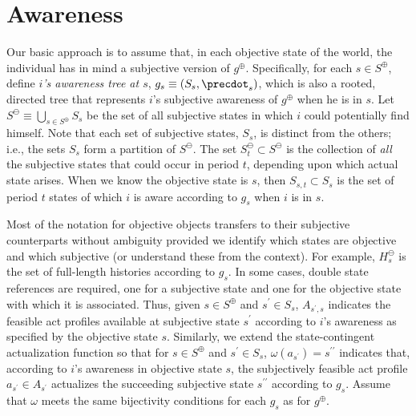 \documentclass[
11pt,
titlepage,
reqno,
]{article}%
\theoremstyle{definition}
\begin{document}
\section{Awareness}
Our basic approach is to assume that, in each objective state of the world, the individual has in mind a subjective version of $g^\oplus$. 
Specifically, for each $s\in S^\oplus$, define \textit{$i$'s awareness tree at $s$}, $g_s\equiv(S_s,\precdot_s)$, which is also a rooted, directed tree that represents $i$'s subjective awareness of $g^\oplus$ when he is in $s$.
Let $S^\ominus\equiv \bigcup_{s\in S^\oplus}S_s$ be the set of all subjective states in which $i$ could potentially find himself.
Note that each set of subjective states, $S_s$,  is distinct from the others; i.e., the sets $S_s$ form a partition of $S^\ominus$.
The set $S^\ominus_t\subset S^\ominus$ is the collection of \textit{all} the subjective states that could occur in period $t$, depending upon which actual state arises.
When we know the objective state is $s$, then $S_{s,t}\subset S_s$ is the set of period $t$ states of which $i$ is aware according to $g_s$ when $i$ is in $s$.

Most of the notation for objective objects transfers to their subjective counterparts without ambiguity provided we identify which states are objective and which subjective (or understand these from the context).
For example, $H^\ominus_s$ is the set of full-length histories according to $g_s$.
In some cases, double state references are required, one for a subjective state and one for the objective state with which it is associated.
Thus, given $s\in S^\oplus$ and $s^\prime\in S_s$, $A_{s^\prime,s}$ indicates the feasible act profiles available at subjective state $s^\prime$ according to $i$'s awareness as specified by the objective state $s$.
Similarly, we extend the state-contingent actualization function so that for $s\in S^\oplus$ and $s^\prime\in S_s$, $\omega(a_{s^\prime})=s^{\prime\prime}$ indicates that, according to $i$'s awareness  in objective state $s$, the subjectively feasible act profile $a_{s^\prime}\in A_{s^\prime}$ actualizes the succeeding subjective state $s^{\prime\prime}$ according to $g_s$.
Assume that $\omega$ meets the same bijectivity conditions for each $g_s$ as for $g^\oplus$.
\end{document}
